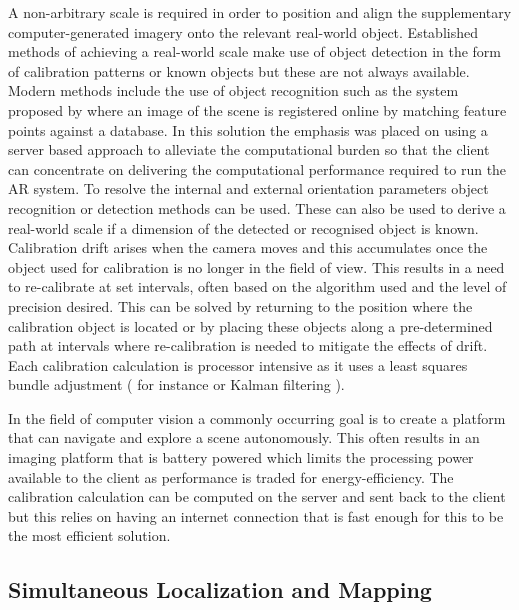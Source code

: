 A non-arbitrary scale is required in order to position and align the supplementary computer-generated imagery onto the relevant real-world object. Established methods of achieving a real-world scale make use of object detection in the form of calibration patterns or known objects but these are not always available. Modern methods include the use of object recognition such as the system proposed by \citet{lepetit_fully_2003} where an image of the scene is registered online by matching feature points against a database. In this solution the emphasis was placed on using a server based approach to alleviate the computational burden so that the client can concentrate on delivering the computational performance required to run the AR system.
\newpage
To resolve the internal and external orientation parameters object recognition or detection methods can be used. These can also be used to derive a real-world scale if a dimension of the detected or recognised object is known. Calibration drift arises when the camera moves and this accumulates once the object used for calibration is no longer in the field of view. This results in a need to re-calibrate at set intervals, often based on the algorithm used and the level of precision desired. This can be solved by returning to the position where the calibration object is located or by placing these objects along a pre-determined path at intervals where re-calibration is needed to mitigate the effects of drift. Each calibration calculation is processor intensive as it uses a least squares bundle adjustment (\citet{tsai_versatile_1987} for instance or Kalman filtering \citep{mirzaei_kalman_2008}). 

In the field of computer vision a commonly occurring goal is to create a platform that can navigate and explore a scene autonomously. This often results in an imaging platform that is battery powered which limits the processing power available to the client as performance is traded for energy-efficiency. The calibration calculation can be computed on the server and sent back to the client but this relies on having an internet connection that is fast enough for this to be the most efficient solution. 

\subsection{Simultaneous Localization and Mapping}

